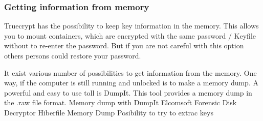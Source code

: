 \subsubsection{Getting information from memory}
Truecrypt has the possibility to keep key information in the memory. This allows you to mount containers, which are encrypted with the same password / Keyfile without to re-enter the password. But if you are not careful with this option others persons could restore your password.

It exist various number of possibilities to get information from the memory. One way, if the computer is still running and unlocked is to make a memory dump. A powerful and easy to use toll is DumpIt. This tool provides a memory dump in the .raw file format.
Memory dump with DumpIt
Elcomsoft Forensic Disk Decryptor
Hiberfile
Memory Dump 
Posibility to try to extrac keys 



